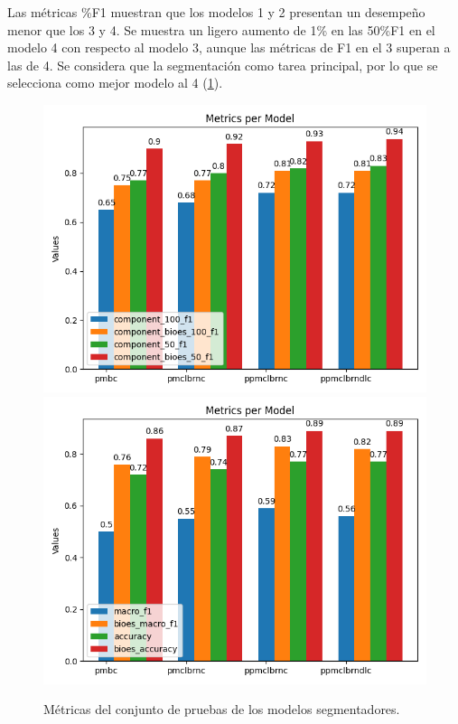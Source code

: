 Las métricas \%F1 muestran que los modelos 1 y 2 presentan un desempeño menor que los 3 y 4. 
Se muestra un ligero aumento de 1\% en las 50\%F1 en el modelo 4 con respecto 
al modelo 3, aunque las métricas de F1 en el 3 superan a las de 4. Se considera que la 
segmentación como tarea principal, por lo que se selecciona como mejor modelo al 4 (\ref{fig:test_segmenter_model_metrics}).

\begin{figure}[h!]
	\begin{center}
		\includegraphics[scale=.4]{Graphics/persuasive_essays_all_linked_components.png}
		\includegraphics[scale=.4]{Graphics/persuasive_essays_all_linked_macro_micro_metrics.png}
	    \caption{Métricas del conjunto de pruebas de los modelos segmentadores.}\label{fig:test_segmenter_model_metrics}
	\end{center}
\end{figure}


